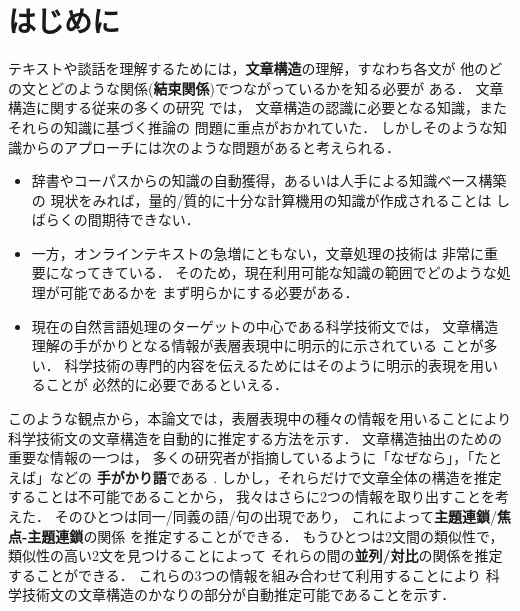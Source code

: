

\maketitle

\section{はじめに}

テキストや談話を理解するためには，{\bf 文章構造}の理解，すなわち各文が
他のどの文とどのような関係({\bf 結束関係})でつながっているかを知る必要が
ある．
文章構造に関する従来の多くの研究
\cite[など]{GroszAndSidner1986,Hobbs1979,Hobbs1985,ZadroznyAndJensen1991}
では，
文章構造の認識に必要となる知識，またそれらの知識に基づく推論の
問題に重点がおかれていた．
しかしそのような知識からのアプローチには次のような問題があると考えられる．
\begin{itemize}
\item 
辞書やコーパスからの知識の自動獲得，あるいは人手による知識ベース構築の
現状をみれば，量的/質的に十分な計算機用の知識が作成されることは
しばらくの間期待できない．
\item 
一方，オンラインテキストの急増にともない，文章処理の技術は
非常に重要になってきている\cite{MUC-41992}．
そのため，現在利用可能な知識の範囲でどのような処理が可能であるかを
まず明らかにする必要がある．
\item 
現在の自然言語処理のターゲットの中心である科学技術文では，
文章構造理解の手がかりとなる情報が表層表現中に明示的に示されている
ことが多い．
科学技術の専門的内容を伝えるためにはそのように明示的表現を用いることが
必然的に必要であるといえる．
\end{itemize}

このような観点から，本論文では，表層表現中の種々の情報を用いることにより
科学技術文の文章構造を自動的に推定する方法を示す．
文章構造抽出のための重要な情報の一つは，
多くの研究者が指摘しているように「なぜなら」，「たとえば」などの
{\bf 手がかり語}である
\cite[など]{Cohen1984,GroszAndSidner1986,Reichman1985,Ono1989,Yamamoto1991}. 
しかし，それらだけで文章全体の構造を推定することは不可能であることから，
我々はさらに2つの情報を取り出すことを考えた．
そのひとつは同一/同義の語/句の出現であり，
これによって{\bf 主題連鎖}/{\bf 焦点-主題連鎖}の関係
\cite{PolanyiAndScha1984}を推定することができる．
もうひとつは2文間の類似性で，類似性の高い2文を見つけることによって
それらの間の{\bf 並列/対比}の関係を推定することができる．
これらの3つの情報を組み合わせて利用することにより
科学技術文の文章構造のかなりの部分が自動推定可能であることを示す．

